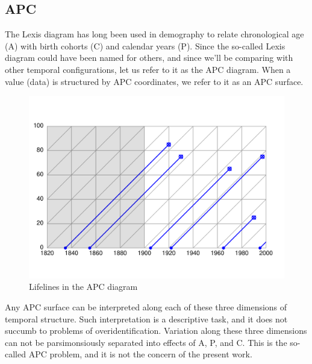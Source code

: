 \documentclass[onehalfspacing]{article}
\begin{document}
\subsection*{APC}
The Lexis diagram has long been used in demography to relate chronological age
(A) with birth cohorts (C) and calendar years (P). Since the so-called Lexis
diagram could have been named for others, and since we'll be comparing
with other temporal configurations, let us refer to it as the APC diagram. When
a value (data) is structured by APC coordinates, we refer to it as an APC
surface.

\begin{figure}[ht!]
    \centering
    \includegraphics[scale=.7]{Figures/LabPres/APC2.pdf}
    \caption{Lifelines in the APC diagram}
    \label{APCright}
\end{figure} 

Any APC surface can be interpreted along each of these
three dimensions of temporal structure. Such interpretation is a descriptive
task, and it does not succumb to problems of overidentification. Variation along
these three dimensions can not be parsimonsiously separated into effects of A,
P, and C. This is the so-called APC problem, and it is not the concern of the
present work. 
\end{document}
